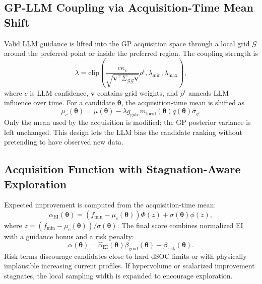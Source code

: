\documentclass[journal]{IEEEtran}
\newcommand{\btheta}{\boldsymbol{\theta}}
\newcommand{\bG}{\mathcal{G}}
\begin{document}
\subsection{GP-LLM Coupling via Acquisition-Time Mean Shift}

Valid LLM guidance is lifted into the GP acquisition space through a local grid
$\bG$ around the preferred point or inside the preferred region. The coupling
strength is
\begin{equation}
\lambda=\mathrm{clip}\left(
\frac{c\kappa_c}{\sqrt{\mathbf{v}^{\top}\Sigma_{\bG\bG}\mathbf{v}}}
\rho^t,\lambda_{\min},\lambda_{\max}\right),
\label{eq:lambda}
\end{equation}
where $c$ is LLM confidence, $\mathbf{v}$ contains grid weights, and $\rho^t$
anneals LLM influence over time. For a candidate $\btheta$, the acquisition-time
mean is shifted as
\begin{equation}
\mu_c(\btheta)=\mu(\btheta)
-\lambda g_{\mathrm{gate}}m_{\mathrm{local}}(\btheta)q(\btheta)\hat\sigma_y .
\label{eq:shift}
\end{equation}
Only the mean used by the acquisition is modified; the GP posterior variance is
left unchanged. This design lets the LLM bias the candidate ranking without
pretending to have observed new data.

\subsection{Acquisition Function with Stagnation-Aware Exploration}

Expected improvement is computed from the acquisition-time mean:
\begin{equation}
\alpha_{\mathrm{EI}}(\btheta)
=(f_{\min}-\mu_c(\btheta))\Phi(z)+\sigma(\btheta)\phi(z),
\label{eq:ei}
\end{equation}
where $z=(f_{\min}-\mu_c(\btheta))/\sigma(\btheta)$. The final score combines
normalized EI with a guidance bonus and a risk penalty:
\begin{equation}
\alpha(\btheta)=\widehat{\alpha}_{\mathrm{EI}}(\btheta)
\beta_{\mathrm{guid}}(\btheta)-\beta_{\mathrm{risk}}(\btheta).
\label{eq:acq}
\end{equation}
Risk terms discourage candidates close to hard dSOC limits or with physically
implausible increasing current profiles. If hypervolume or scalarized
improvement stagnates, the local sampling width is expanded to encourage
exploration.
\end{document}
